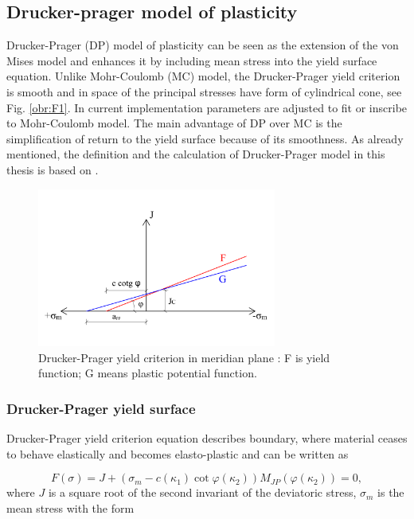 \subsection{Drucker-prager model of plasticity}\label{sec:drucker-prager_introduction}
\indent

Drucker-Prager (DP) model of plasticity can be seen as the extension of the von Mises model and enhances it by including mean stress into the yield surface equation. Unlike Mohr-Coulomb (MC) model, the Drucker-Prager yield criterion is smooth and in space of the principal stresses have form of cylindrical cone, see Fig. \ref{obr:F1}. In current implementation parameters are adjusted to fit or inscribe to Mohr-Coulomb model. The main advantage of DP over MC is the simplification of return to the yield surface because of its smoothness. As already mentioned, the definition and the calculation of Drucker-Prager model in this thesis is based on \cite{geofem}.   

\begin{figure}[h!]
	\centering	
	\includegraphics[width=0.7\textwidth, angle=0]{obrazky/drucker_prager_meridian_my.png}
	\caption[Drucker-Prager yield criterion on meridian plane $T$]{Drucker-Prager yield criterion in meridian plane \cite{geofem}: F is yield function; G means plastic potential function.} \label{obr:M1}
\end{figure}

\subsubsection{Drucker-Prager yield surface}\label{sec:drucker-prager_yield_criterion}
\indent

Drucker-Prager yield criterion equation describes boundary, where material ceases to behave elastically and becomes elasto-plastic and can be written as  

\begin{equation}\label{eq:f_yc}
	F(\sigma) = J + (\sigma_m-c(\kappa_{1}) \cot \varphi(\kappa_{2}) )M_{JP}(\varphi(\kappa_{2})) = 0,
\end{equation}
where $J$ is a square root of the second invariant of the deviatoric stress, $\sigma_m$ is the mean stress with the form 
 
